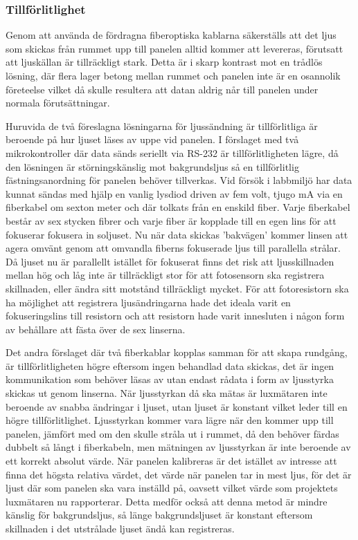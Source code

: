         \subsubsection{Tillförlitlighet} %
        \label{sub:tillf_rlitlighet}
            Genom att använda de fördragna fiberoptiska kablarna säkerställs att det ljus som skickas från rummet upp till panelen alltid kommer att levereras, förutsatt att ljuskällan är tillräckligt stark. Detta är i skarp kontrast mot en trådlös lösning, där flera lager betong mellan rummet och panelen inte är en osannolik företeelse vilket då skulle resultera att datan aldrig når till panelen under normala förutsättningar. \bigskip

            Huruvida de två föreslagna lösningarna för ljussändning är tillförlitliga är beroende på hur ljuset läses av uppe vid panelen. I förslaget med två mikrokontroller där data sänds seriellt via RS-232 är tillförlitligheten lägre, då den lösningen är störningskänslig mot bakgrundsljus så en tillförlitlig fästningsanordning för panelen behöver tillverkas. Vid försök i labbmiljö har data kunnat sändas med hjälp en vanlig lysdiod driven av fem volt, tjugo mA via en fiberkabel om sexton meter och där tolkats från en enskild fiber. Varje fiberkabel består av sex stycken fibrer och varje fiber är kopplade till en egen lins för att fokuserar fokusera in soljuset. Nu när data skickas 'bakvägen' kommer linsen att agera omvänt genom att omvandla fiberns fokuserade ljus till parallella strålar. Då ljuset nu är parallellt istället för fokuserat finns det risk att ljusskillnaden mellan hög och låg inte är tillräckligt stor för att fotosensorn ska registrera skillnaden, eller ändra sitt motstånd tillräckligt mycket. För att fotoresistorn ska ha möjlighet att registrera ljusändringarna hade det ideala varit en fokuseringslins till resistorn och att resistorn hade varit innesluten i någon form av behållare att fästa över de sex linserna. \bigskip

            Det andra förslaget där två fiberkablar kopplas samman för att skapa rundgång, är tillförlitligheten högre eftersom ingen behandlad data skickas, det är ingen kommunikation som behöver läsas av utan endast rådata i form av ljusstyrka skickas ut genom linserna. När ljusstyrkan då ska mätas är luxmätaren inte beroende av snabba ändringar i ljuset, utan ljuset är konstant vilket leder till en högre tillförlitlighet. Ljusstyrkan kommer vara lägre när den kommer upp till panelen, jämfört med om den skulle stråla ut i rummet, då den behöver färdas dubbelt så långt i fiberkabeln, men mätningen av ljusstyrkan är inte beroende av ett korrekt absolut värde. När panelen kalibreras är det istället av intresse att finna det högsta relativa värdet, det värde när panelen tar in mest ljus, för det är ljust där som panelen ska vara inställd på, oavsett vilket värde som projektets luxmätaren nu rapporterar. Detta medför också att denna metod är mindre känslig för bakgrundsljus, så länge bakgrundsljuset är konstant eftersom skillnaden i det utstrålade ljuset ändå kan registreras.\bigskip 

